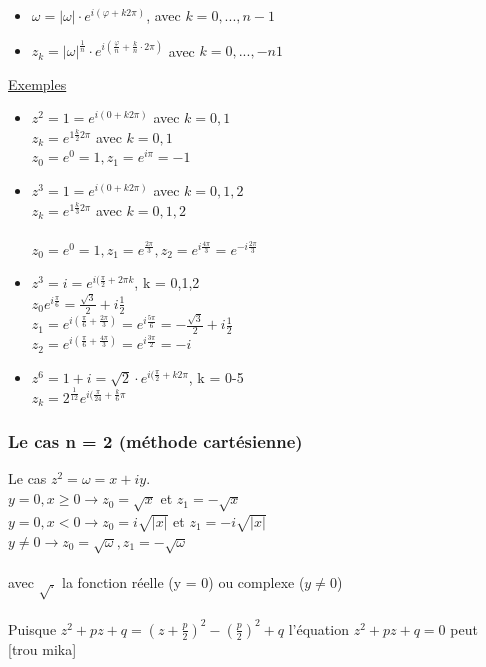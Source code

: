 \documentclass[12pt,a4paper]{article}
\begin{document}
{\begin{itemize}
\item $\omega = |\omega|\cdot e^{i(\varphi + k2\pi)}$, avec $k = 0,...,n-1$
\item $z_k = |\omega|^{\frac{1}{n}} \cdot e^{i(\frac{\varphi}{n} + \frac{k}{n}\cdot 2\pi)}$ avec $k = 0,...,-n1$
\end{itemize}
\underline{Exemples}
\begin{itemize}
\item $z^2 = 1 = e^{i(0+k2\pi)}$ avec $ k = 0,1$\\
$z_k = e^{1\frac{k}{2}2\pi}$ avec $k = 0,1$\\
$z_0 = e^0 = 1, z_1 = e^{i\pi} = -1$
\item $z^3 = 1 = e^{i(0 + k2\pi)}$ avec $k = 0,1,2$\\
$z_k = e^{1\frac{k}{3}2\pi}$ avec $k = 0,1,2$\\\\
$z_0 = e^0 = 1, z_1 = e^{\frac{2\pi}{3}}, z_2 = e^{i\frac{4\pi}{3}} = e^{-i\frac{2\pi}{3}}$
\item %
$z^3 = i = e^{i(\frac{\pi}{2} + 2\pi k}$, k = 0,1,2\\
$z_0 e^{i\frac{\pi}{6}} = \frac{\sqrt{3}}{2} + i\frac{1}{2} $\\
$z_1 = e^{i(\frac{\pi}{6} + \frac{2\pi}{3})} = e^{i\frac{5\pi}{6}} = -\frac{\sqrt{3}}{2} + i \frac{1}{2}$\\
$z_2 = e^{i(\frac{\pi}{6} + \frac{4\pi}{3})} = e^{i\frac{3\pi}{2}} = -i$
\item $z^6 = 1+i = \sqrt{2}\cdot e^{i(\frac{\pi}{2} + k2\pi}$, k = 0-5\\
$z_k = 2^\frac{1}{12}e^{i(\frac{\pi}{24} + \frac{k}{6}\pi}$
\end{itemize}

\subsubsection{Le cas n = 2 (méthode cartésienne)}
Le cas $z^2 = \omega = x + iy$.\\
$y = 0, x \geq 0 \to z_0 = \sqrt{x}$ et $ z_1 = -\sqrt{x}$\\
$y = 0, x < 0 \to z_0 = i\sqrt{|x|}$ et $ z_1 = -i\sqrt{|x|}$\\
$y \neq 0 \to z_0 = \sqrt{\omega}, z_1 = -\sqrt{\omega}$\\
\\
avec $\sqrt{.}$ la fonction réelle (y = 0) ou complexe ($y \neq 0$)\\
\\
Puisque $z^2 + pz + q = (z + \frac{p}{2})^2 - (\frac{p}{2})^2 + q$ l'équation $z^2 + pz + q = 0$ peut 
[trou mika]
}
\end{document}

